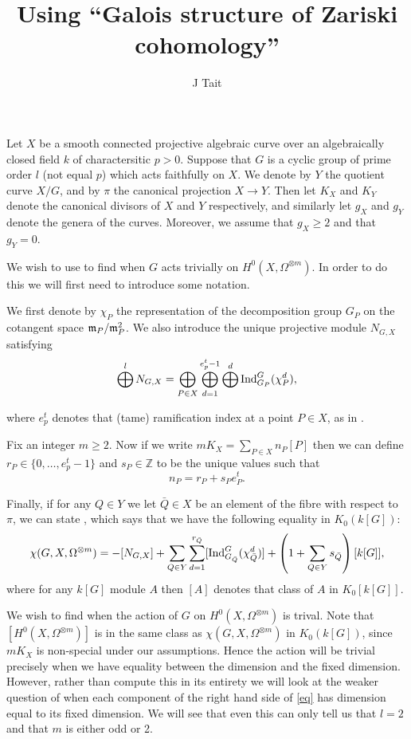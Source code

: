\documentclass[11pt]{article} %
\title{Using ``Galois structure of Zariski cohomology''}
\author{J Tait}
\theoremstyle{remark}\newtheorem*{rem}{Remark}
\newcommand{\ZZ}{{\mathbb Z}}
\begin{document}
\maketitle
Let $X$ be a smooth connected projective algebraic curve over an algebraically closed field $k$ of charactersitic $p>0$.
Suppose that $G$ is a cyclic group of prime order $l$ (not equal $p$) which acts faithfully on $X$.
We denote by $Y$ the quotient curve $X/G$, and by $\pi$ the canonical projection $X\rightarrow Y$.
Then let $K_X$ and $K_Y$ denote the canonical divisors of $X$ and $Y$ respectively, and similarly let $g_X$ and $g_Y$ denote the genera of the curves.
Moreover, we assume that $g_X\geq 2$ and that $g_Y = 0$.


We wish to use \citep[Thm 4.5]{galiosstruc} to find when $G$ acts trivially on $H^0(X,\Omega^{\otimes m})$.
In order to do this we will first need to introduce some notation.

We first denote by $\chi_P$ the representation of the decomposition group $G_P$ on the cotangent space $\frak m_P/\frak m_P^2$.
We also introduce the unique projective module $N_{G,X}$ satisfying
\begin{equation*}
 \bigoplus^l N_{G,X} = \bigoplus_{P\in X} \bigoplus_{d=1}^{e^t_p-1} \bigoplus^d {\rm Ind}_{G_P}^G(\chi_P^d),
\end{equation*}

where $e^t_p$ denotes that (tame) ramification index at a point $P\in X$, as in \citep[Thm 4.3]{galiosstruc}.

Fix an integer $m\geq 2$. Now if we write $mK_X = \sum_{P\in X} n_P[P]$ then we can define $r_P\in \{0,\ldots, e^t_p - 1\}$ and $s_P\in \ZZ$ to be the unique values such that
\[
 n_P = r_P + s_Pe_P^t.
\]

Finally, if for any $Q\in Y$ we let $\bar Q \in X$ be an element of the fibre with respect to $\pi$, we can state \citep[Thm 4.5]{galiosstruc}, which says that we have the following equality in $K_0(k[G])$:
\begin{equation}\label{eq}
 \chi(G,X,\Omega^{\otimes m}) = -[N_{G,X}] +\sum_{Q\in Y}\sum^{r_{\bar Q}}_{d=1} [{\rm Ind}_{G_{\bar Q}}^G(\chi_{\bar Q}^d)]  + \left( 1 + \sum_{Q\in Y} s_{\bar Q} \right) [k[G]],
\end{equation}
where for any $k[G]$ module $A$ then $[A]$ denotes that class of $A$ in $K_0[k[G]]$.

We wish to find when the action of $G$ on $H^0(X,\Omega^{\otimes m})$ is trival.
Note that $[H^0(X,\Omega^{\otimes m})]$ is in the same class as $\chi(G,X,\Omega^{\otimes m})$ in $K_0(k[G])$, since $mK_X$ is non-special under our assumptions.
Hence the action will be trivial precisely when we have equality between the dimension and the fixed dimension.
However, rather than compute this in its entirety we will look at the weaker question of when each component of the right hand side of \ref{eq} has dimension equal to its fixed dimension.
We will see that even this can only tell us that $l=2$ and that $m$ is either odd or 2.
\end{document}
